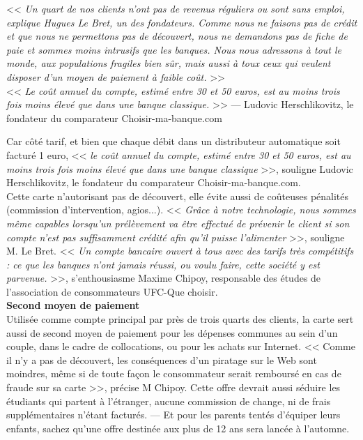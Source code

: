 \documentclass[11pt,twoside,a4paper]{article}
\begin{document}
\begin{minipage}[h]{0.75\textwidth}
	<< \emph{Un quart de nos clients n'ont pas de revenus r{\'e}guliers ou sont sans emploi, explique Hugues Le Bret, un des fondateurs. Comme nous ne faisons pas de cr{\'e}dit et que nous ne permettons pas de d{\'e}couvert, nous ne demandons pas de fiche de paie et sommes moins intrusifs que les banques. Nous nous adressons {\`a} tout le monde, aux populations fragiles bien s{\^u}r, mais aussi {\`a} toux ceux qui veulent disposer d'un moyen de paiement {\`a} faible co{\^u}t. } >> ~\\
	<< \emph{Le co{\^u}t annuel du compte, estim{\'e} entre 30 et 50 euros, est au moins trois fois moins {\'e}lev{\'e} que dans une banque classique. } >> --- Ludovic Herschlikovitz, le fondateur du comparateur Choisir-ma-banque.com ~\\
\end{minipage}

Car c{\^o}t{\'e} tarif, et bien que chaque d{\'e}bit dans un distributeur automatique soit factur{\'e} 1 euro, << \emph{le co{\^u}t annuel du compte, estim{\'e} entre 30 et 50 euros, est au moins trois fois moins {\'e}lev{\'e} que dans une banque classique} >>, souligne Ludovic Herschlikovitz, le fondateur du comparateur Choisir-ma-banque.com. ~\\

Cette carte n'autorisant pas de d{\'e}couvert, elle {\'e}vite aussi de co{\^u}teuses p{\'e}nalit{\'e}s (commission d'intervention, agios...). << \emph{Gr{\^a}ce {\`a} notre technologie, nous sommes m{\^e}me capables lorsqu'un pr{\'e}l{\`e}vement va {\^e}tre effectu{\'e} de pr{\'e}venir le client si son compte n'est pas suffisamment cr{\'e}dit{\'e} afin qu'il puisse l'alimenter} >>, souligne M. Le Bret.  << \emph{Un compte bancaire ouvert {\`a} tous avec des tarifs tr{\`e}s comp{\'e}titifs  : ce que les banques n'ont jamais r{\'e}ussi, ou voulu faire, cette soci{\'e}t{\'e} y est parvenue. } >>, s'enthousiasme Maxime Chipoy, responsable des {\'e}tudes de l'association de consommateurs UFC-Que choisir. ~\\

\textbf{Second moyen de paiement} ~\\

Utilis{\'e}e comme compte principal par pr{\`e}s de trois quarts des clients, la carte sert aussi de second moyen de paiement pour les d{\'e}penses communes au sein d'un couple, dans le cadre de collocations, ou pour les achats sur Internet. <<  Comme il n'y a pas de d{\'e}couvert, les cons{\'e}quences d'un piratage sur le Web sont moindres, m{\^e}me si de toute fa\c{c}on le consommateur serait rembours{\'e} en cas de fraude sur sa carte  >>, pr{\'e}cise M Chipoy. Cette offre devrait aussi s{\'e}duire les {\'e}tudiants qui partent {\`a} l'{\'e}tranger, aucune commission de change, ni de frais suppl{\'e}mentaires n'{\'e}tant factur{\'e}s. --- Et pour les parents tent{\'e}s d'{\'e}quiper leurs enfants, sachez qu'une offre destin{\'e}e aux plus de 12 ans sera lanc{\'e}e {\`a} l'automne. ~\\
\end{document}
